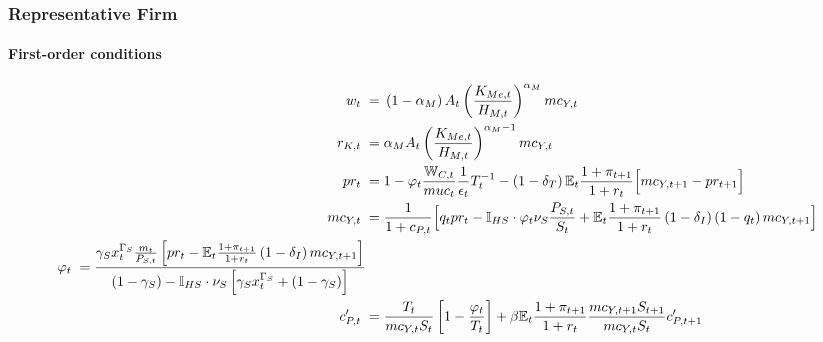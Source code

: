 \documentclass[12pt,3p,authoryear,review]{elsarticle}
\begin{document}
\subsubsection{Representative Firm}%
\begin{small}%
 \paragraph{First-order conditions}%
 \begin{align}%
	w_t \; = & \; \left(1-\alpha_M\right) A_t \left(\frac{K_{Me,t}}{H_{M,t}}\right)^{\alpha_M} mc_{Y,t}\\%
	r_{K,t} \; = & \; \alpha_M A_t \left(\frac{K_{Me,t}}{H_{M,t}}\right)^{\alpha_M-1} mc_{Y,t}\\%
	pr_t \; = & \; 1 - \varphi_t \frac{\mathbb{W}_{C,t}}{muc_t} \frac{1}{\epsilon_t} T_t^{-1} - \left(1-\delta_T\right)\mathbb{E}_t \frac{1+\pi_{t+1}}{1+r_t} \Bigl[mc_{Y,t+1}-pr_{t+1}\Bigr]\\%
	mc_{Y,t} \; = & \; \frac{1}{1+c_{P,t}}  \Bigl[ q_t pr_t - \mathbb{I}_{HS} \cdot \varphi_t \nu_S \frac{P_{S,t}}{S_t} + \mathbb{E}_t \frac{1+\pi_{t+1}}{1+r_t} \left(1-\delta_I\right) \left(1-q_t\right) mc_{Y,t+1} \Bigr]\\%
	\begin{split}%
		\varphi_t \; = & \; \frac{\gamma_S x_t^{\Gamma_S} \frac{m_t}{P_{S,t}} \left[pr_t - \mathbb{E}_t \frac{1+\pi_{t+1}}{1+r_t} \left(1-\delta_I\right) mc_{Y,t+1} \right]}{(1-\gamma_S)-\mathbb{I}_{HS}\cdot\nu_S \left[ \gamma_S x_t^{\Gamma_S}+\left(1-\gamma_S\right) \right]}%
	\end{split}\\
	c^{\prime}_{P,t} \; = & \; \frac{T_t}{mc_{Y,t} S_t} \left[ 1 - \frac{\varphi_t}{T_t} \right] + \beta \mathbb{E}_t \frac{1+\pi_{t+1}}{1+r_t} \frac{mc_{Y,t+1} S_{t+1}}{mc_{Y,t} S_t} c^{\prime}_{P,t+1}%
 \end{align}%
\end{small}%
\pagebreak%
\end{document}

